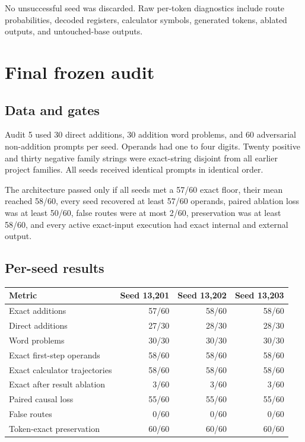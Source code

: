 \documentclass[11pt]{article}
\begin{document}
No unsuccessful seed was discarded. Raw per-token diagnostics include route
probabilities, decoded registers, calculator symbols, generated tokens,
ablated outputs, and untouched-base outputs.

\section{Final frozen audit}

\subsection{Data and gates}

Audit 5 used 30 direct additions, 30 addition word problems, and 60
adversarial non-addition prompts per seed. Operands had one to four digits.
Twenty positive and thirty negative family strings were exact-string disjoint
from all earlier project families. All seeds received identical prompts in
identical order.

The architecture passed only if all seeds met a 57/60 exact floor, their mean
reached 58/60, every seed recovered at least 57/60 operands, paired ablation
loss was at least 50/60, false routes were at most 2/60, preservation was at
least 58/60, and every active exact-input execution had exact internal and
external output.

\subsection{Per-seed results}

\begin{center}
\small
\begin{tabular}{lrrr}
\toprule
Metric & Seed 13,201 & Seed 13,202 & Seed 13,203\\
\midrule
Exact additions & 57/60 & 58/60 & 58/60\\
Direct additions & 27/30 & 28/30 & 28/30\\
Word problems & 30/30 & 30/30 & 30/30\\
Exact first-step operands & 58/60 & 58/60 & 58/60\\
Exact calculator trajectories & 58/60 & 58/60 & 58/60\\
Exact after result ablation & 3/60 & 3/60 & 3/60\\
Paired causal loss & 55/60 & 55/60 & 55/60\\
False routes & 0/60 & 0/60 & 0/60\\
Token-exact preservation & 60/60 & 60/60 & 60/60\\
\bottomrule
\end{tabular}
\end{center}
\end{document}
